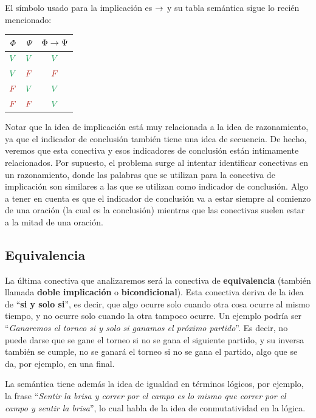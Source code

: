El símbolo usado para la implicación es $\to$ y su tabla semántica sigue lo
recién mencionado:

\begin{tabular}{ c | c | c }
    \textbf{$\Phi$} & \textbf{$\Psi$} & \textbf{$\Phi \to \Psi$}\\
    \hline
    $\ltrue$  & $\ltrue$  & $\ltrue$  \\
    $\ltrue$  & $\lfalse$ & $\lfalse$ \\
    $\lfalse$ & $\ltrue$  & $\ltrue$  \\
    $\lfalse$ & $\lfalse$ & $\ltrue$  \\
\end{tabular}

Notar que la idea de implicación está muy relacionada a la idea de razonamiento,
ya que el indicador de conclusión también tiene una idea de secuencia. De hecho,
veremos que esta conectiva y esos indicadores de conclusión están intimamente
relacionados. Por supuesto, el problema surge al intentar identificar conectivas
en un razonamiento, donde las palabras que se utilizan para la conectiva de
implicación son similares a las que se utilizan como indicador de conclusión.
Algo a tener en cuenta es que el indicador de conclusión va a estar siempre al
comienzo de una oración (la cual es la conclusión) mientras que las conectivas
suelen estar a la mitad de una oración.

\subsection{Equivalencia}
\label{chap:logica_proposicional:subsec:iff}

La última conectiva que analizaremos será la conectiva de \textbf{equivalencia}
(también llamada \textbf{doble implicación} o \textbf{bicondicional}). Esta
conectiva deriva de la idea de ``\textbf{si y solo si}'', es decir, que algo
ocurre solo cuando otra cosa ocurre al mismo tiempo, y no ocurre solo cuando la
otra tampoco ocurre. Un ejemplo podría ser ``\textit{Ganaremos el torneo si y
solo si ganamos el próximo partido}''. Es decir, no puede darse que se gane el
torneo si no se gana el siguiente partido, y su inversa también se cumple, no se
ganará el torneo si no se gana el partido, algo que se da, por ejemplo, en una
final.

La semántica tiene además la idea de igualdad en términos lógicos, por ejemplo,
la frase ``\textit{Sentir la brisa y correr por el campo es lo mismo que correr
por el campo y sentir la brisa}'', lo cual habla de la idea de conmutatividad en
la lógica.

